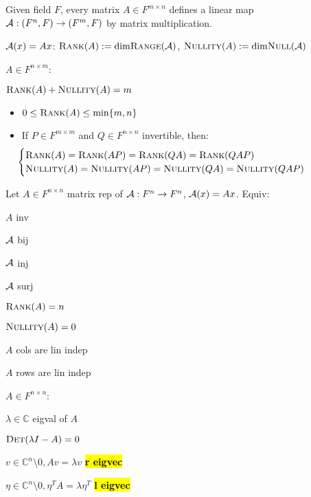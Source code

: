 \begin{Theorem}
Given field $F$, every matrix $A\in F^{m\times n}$ defines a linear map $\mathcal{A}:(F^n,F)\to(F^m,F)$ by matrix multiplication.
\end{Theorem}
\begin{Definition}
$\mathcal{A}(x)=Ax$: $\textsc{Rank}(A):=\text{dim}\textsc{Range}(\mathcal{A})$, $\textsc{Nullity}(A):=\text{dim}\textsc{Null}(\mathcal{A})$
\end{Definition}
\begin{Theorem}
$A\in F^{n\times m}$: \begin{itemize*}
\item $\textsc{Rank}(A)+\textsc{Nullity}(A)=m$
\end{itemize*}
\begin{itemize}[leftmargin=16.9mm]
  \item $0\le\textsc{Rank}(A)\le\min\{m,n\}$
  \item If $P\in F^{m\times m}$ and $Q\in F^{n\times n}$ invertible, then:
\begin{equation*}
\hspace{-15mm}
\begin{cases}
\Rank(A)=\Rank(AP)=\Rank(QA)=\Rank(QAP) \\
\Nullity(A)=\Nullity(AP)=\Nullity(QA)=\Nullity(QAP)
\end{cases}
\end{equation*}
\end{itemize}
\end{Theorem}
\begin{Theorem}
Let $A\in F^{n\times n}$ matrix rep of $\mathcal{A}:F^n\to F^n$, $\mathcal{A}(x)=Ax$. Equiv:
\begin{enumerate*}
  \item $A$ inv
  \item $\mathcal{A}$ bij
  \item $\mathcal{A}$ inj
  \item $\mathcal{A}$ surj
  \item $\textsc{Rank}(A)=n$
  \item $\textsc{Nullity}(A)=0$
  \item $A$ cols are lin indep
  \item $A$ rows are lin indep
\end{enumerate*}
\end{Theorem}
\begin{Theorem}
$A\in F^{n\times n}$:
\begin{itemize*}
  \item $\lambda\in\mathbb C$ eigval of $A$
  \item $\textsc{Det}(\lambda I-A)=0$
  \item $v\in \mathbb C^n\setminus 0, Av=\lambda v$ \textbf{\hl{r eigvec}}
  \item $\eta\in \mathbb C^n\setminus 0, \eta^TA=\lambda\eta^T$ \textbf{\hl{l eigvec}}
\end{itemize*}
\end{Theorem}
